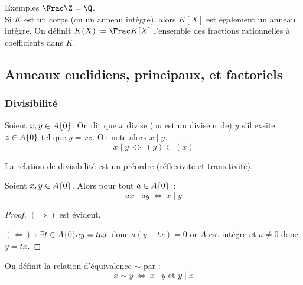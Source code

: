 \begin{example}{Exemples}
 $\Frac \Z = \Q$.\\
Si $K$ est un corps (ou un anneau intègre), alors $K[X]$ est également un
anneau intègre. On définit $K(X) := \Frac K[X]$ l'ensemble des fractions
rationnelles à coefficients dans $K$. 
\end{example}


\subsection{Anneaux euclidiens, principaux, et factoriels}
\vspace{0.5em}

\subsubsection{Divisibilité}
\vspace{0.5em}

\begin{defi}[Divisibilité]

 Soient $x,y \in A\-\{0\}$. On dit que $x$ divise (ou est un
diviseur de) $y$ s'il exsite $z\in A\-\{0\}$ tel que $y=xz$. On
note alors $x\mid y$.
 \begin{displaymath}
  x \mid y\ \Longleftrightarrow\ (y) \subset (x)
 \end{displaymath}
\end{defi}

\begin{example}[Remarque]
 La relation de divisibilité est un préordre (réflexivité et transitivité).
\end{example}

\begin{prop}
 
Soient $x,y \in A\-\{0\}$. Alors pour tout $a\in
A\-\{0\}$ : 
\begin{displaymath}
 ax \mid ay\ \Longleftrightarrow\ x \mid y
\end{displaymath}
\end{prop}

\begin{proof} $(\Rightarrow)$ est évident.

$(\Leftarrow)$ : $\exists t \in A\-\{0\} ay = tax$ donc $a(y-tx) =
0$ or $A$ est intègre et $a \neq 0$ donc $y = tx$.
\end{proof}

\begin{defi}

On définit la relation d'équivalence $\sim$ par :
\begin{displaymath}
 x\sim y\ \Longleftrightarrow\ x\mid y \text{ et } y\mid x
\end{displaymath}
\end{defi}

